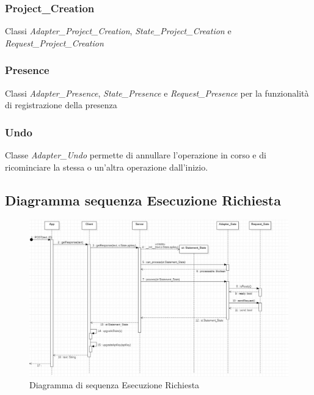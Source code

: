 \subsubsection{Project\_Creation} Classi \textit{Adapter\_Project\_Creation}, \textit{State\_Project\_Creation} e \textit{Request\_Project\_Creation}
\subsubsection{Presence} Classi \textit{Adapter\_Presence}, \textit{State\_Presence} e \textit{Request\_Presence} per la funzionalità di registrazione della presenza
\subsubsection{Undo} Classe \textit{Adapter\_Undo} permette di annullare l'operazione in corso e di ricominciare la stessa o un'altra operazione dall'inizio.
\subsection{Diagramma sequenza Esecuzione Richiesta}
\newpage

\begin{landscape}
	\begin{figure}[H]
	\centering\includegraphics[width=\linewidth]{images/diagramma_sequenza_server.jpg}
    \caption{Diagramma di sequenza Esecuzione Richiesta }
	\end{figure}
\end{landscape}

